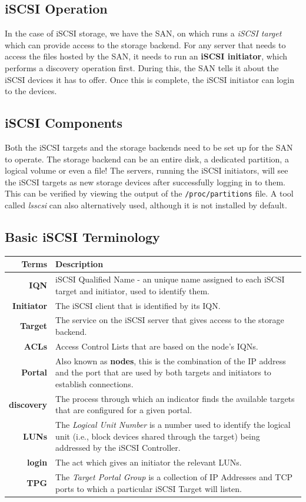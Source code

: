 \subsection{iSCSI Operation}
In the case of iSCSI storage, we have the SAN, on which runs a \textit{iSCSI target} which can provide access to the storage backend. For any server that needs to access the files hosted by the SAN, it needs to run an \textbf{iSCSI initiator}, which performs a discovery operation first. During this, the SAN tells it about the iSCSI devices it has to offer. Once this is complete, the iSCSI initiator can login to the devices.


\subsection{iSCSI Components}
Both the iSCSI targets and the storage backends need to be set up for the SAN to operate. The storage backend can be an entire disk, a dedicated partition, a logical volume or even a file! The servers, running the iSCSI initiators, will see the iSCSI targets as new storage devices after successfully logging in to them. This can be verified by viewing the output of the \verb|/proc/partitions| file. A tool called \textit{lsscsi} can also alternatively used, although it is not installed by default. 

\subsection{Basic iSCSI Terminology}
\noindent
\begin{tabular}{rM{0.85}}
	\toprule
	\textbf{Terms} &\textbf{Description} \\
	\midrule
	\textbf{IQN}	&iSCSI Qualified Name - an unique name assigned to each iSCSI target and initiator, used to identify them.\\
	\textbf{Initiator}	&The iSCSI client that is identified by its IQN.\\
	\textbf{Target}	&The service on the iSCSI server that gives access to the storage backend.\\
	\textbf{ACLs}	&Access Control Lists that are based on the node's IQNs.\\
	\textbf{Portal}	&Also known as \textbf{nodes}, this is the combination of the IP address and the port that are used by both targets and initiators to establish connections.\\
	\textbf{discovery} &The process through which an indicator finds the available targets that are configured for a given portal.\\
	\textbf{LUNs} &The \textit{Logical Unit Number} is a number used to identify the logical unit (i.e., block devices shared through the target) being addressed by the iSCSI Controller.\\
	\textbf{login} &The act which gives an initiator the relevant LUNs.\\
	\textbf{TPG} &The \textit{Target Portal Group} is a collection of IP Addresses and TCP ports to which a particular iSCSI Target will listen.\\
	\bottomrule
\end{tabular}

